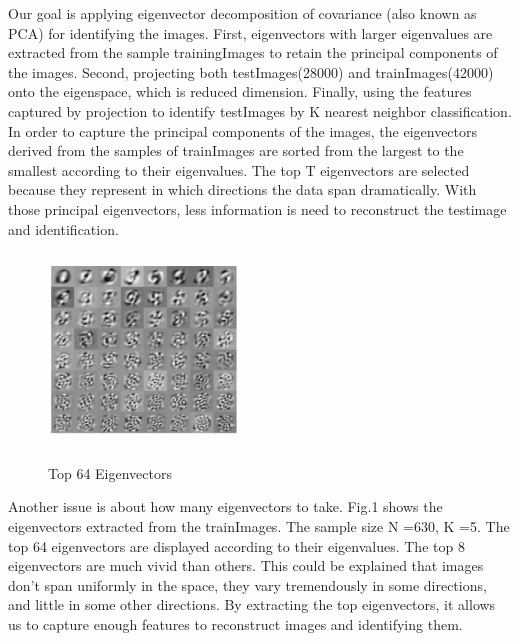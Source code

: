 \documentclass{article} %
\begin{document}
Our goal is applying eigenvector decomposition of covariance (also known as
PCA) for identifying the images. First, eigenvectors with larger eigenvalues
are extracted from the sample trainingImages to retain the principal
components of the images. Second, projecting both testImages(28000) and
trainImages(42000) onto the eigenspace, which is reduced dimension. Finally,
using the features captured by projection to identify testImages by K nearest
neighbor classification.  In order to capture the principal components of the
images, the eigenvectors derived from the samples of trainImages are sorted
from the largest to the smallest according to their eigenvalues. The top T
eigenvectors are selected because they represent in which directions the data
span dramatically.  With those principal eigenvectors, less information is
need to reconstruct the testimage and identification. 

\begin{figure}[h]
\begin{center}
    \includegraphics[width=2in,height=2in]{./images/eigenvector.png} \\
    \caption{Top 64 Eigenvectors } 
\end{center}
\end{figure}

Another issue is about how many eigenvectors to take. Fig.1 shows the
eigenvectors extracted from the trainImages. The sample size N =630, K =5. The
top 64 eigenvectors are displayed according to their eigenvalues. The  top 8
eigenvectors are much vivid than others. This could be explained that images
don't span uniformly in the space, they vary tremendously in some directions,
and little in some other directions. By extracting the top eigenvectors, it
allows us to capture enough features to reconstruct images and identifying
them.
\end{document}

